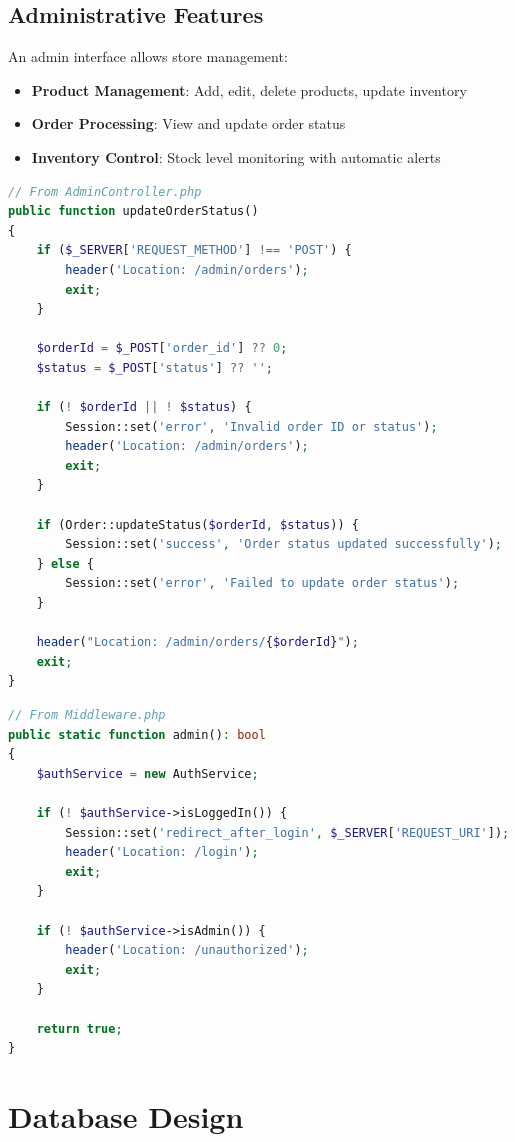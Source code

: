 \documentclass{article}
\begin{document}
\subsection{Administrative Features}
An admin interface allows store management:
\begin{itemize}
	\item \textbf{Product Management}: Add, edit, delete products, update inventory
	\item \textbf{Order Processing}: View and update order status
	\item \textbf{Inventory Control}: Stock level monitoring with automatic alerts
\end{itemize}

\begin{lstlisting}[language=PHP, caption=Admin order status update]
// From AdminController.php
public function updateOrderStatus()
{
    if ($_SERVER['REQUEST_METHOD'] !== 'POST') {
        header('Location: /admin/orders');
        exit;
    }

    $orderId = $_POST['order_id'] ?? 0;
    $status = $_POST['status'] ?? '';

    if (! $orderId || ! $status) {
        Session::set('error', 'Invalid order ID or status');
        header('Location: /admin/orders');
        exit;
    }

    if (Order::updateStatus($orderId, $status)) {
        Session::set('success', 'Order status updated successfully');
    } else {
        Session::set('error', 'Failed to update order status');
    }

    header("Location: /admin/orders/{$orderId}");
    exit;
}
\end{lstlisting}

\begin{lstlisting}[language=PHP, caption=Admin middleware protection]
// From Middleware.php
public static function admin(): bool
{
    $authService = new AuthService;

    if (! $authService->isLoggedIn()) {
        Session::set('redirect_after_login', $_SERVER['REQUEST_URI']);
        header('Location: /login');
        exit;
    }

    if (! $authService->isAdmin()) {
        header('Location: /unauthorized');
        exit;
    }

    return true;
}
\end{lstlisting}

\section{Database Design}
\end{document}
